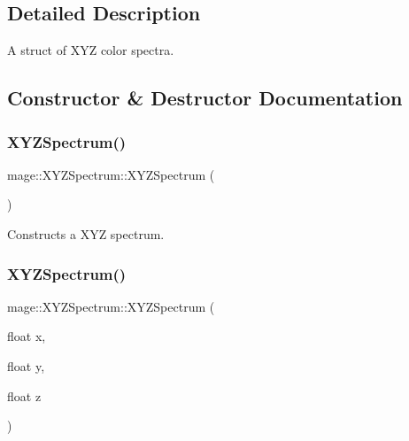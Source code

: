 \subsection{Detailed Description}
A struct of X\+YZ color spectra. 

\subsection{Constructor \& Destructor Documentation}
\hypertarget{structmage_1_1_x_y_z_spectrum_a93dbb49e9cb90dd0aed70e9b6d01fcc8}{}\label{structmage_1_1_x_y_z_spectrum_a93dbb49e9cb90dd0aed70e9b6d01fcc8} 
\subsubsection{\texorpdfstring{X\+Y\+Z\+Spectrum()}{XYZSpectrum()}\hspace{0.1cm}{\footnotesize\ttfamily [1/8]}}
{\footnotesize\ttfamily mage\+::\+X\+Y\+Z\+Spectrum\+::\+X\+Y\+Z\+Spectrum (\begin{DoxyParamCaption}{ }\end{DoxyParamCaption})}

Constructs a X\+YZ spectrum. \hypertarget{structmage_1_1_x_y_z_spectrum_ab768ef493970dd791f8b145eee05f66b}{}\label{structmage_1_1_x_y_z_spectrum_ab768ef493970dd791f8b145eee05f66b} 
\subsubsection{\texorpdfstring{X\+Y\+Z\+Spectrum()}{XYZSpectrum()}\hspace{0.1cm}{\footnotesize\ttfamily [2/8]}}
{\footnotesize\ttfamily mage\+::\+X\+Y\+Z\+Spectrum\+::\+X\+Y\+Z\+Spectrum (\begin{DoxyParamCaption}\item[{float}]{x,  }\item[{float}]{y,  }\item[{float}]{z }\end{DoxyParamCaption})\hspace{0.3cm}{\ttfamily [explicit]}}

